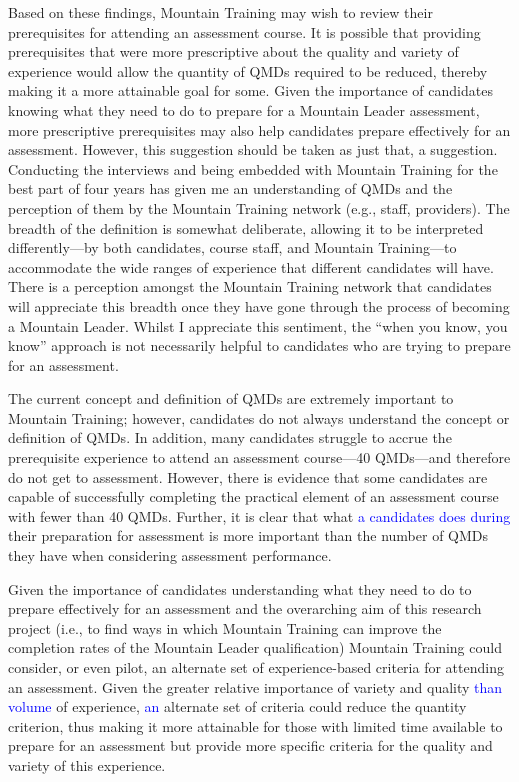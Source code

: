 \documentclass[
  12pt,
  a4paper,
]{book}
\begin{document}
Based on these findings, Mountain Training may wish to review their prerequisites for attending an assessment course. It is possible that providing prerequisites that were more prescriptive about the quality and variety of experience would allow the quantity of QMDs required to be reduced, thereby making it a more attainable goal for some. Given the importance of candidates knowing what they need to do to prepare for a Mountain Leader assessment, more prescriptive prerequisites may also help candidates prepare effectively for an assessment. However, this suggestion should be taken as just that, a suggestion. Conducting the interviews and being embedded with Mountain Training for the best part of four years has given me an understanding of QMDs and the perception of them by the Mountain Training network (e.g., staff, providers). The breadth of the definition is somewhat deliberate, allowing it to be interpreted differently---by both candidates, course staff, and Mountain Training---to accommodate the wide ranges of experience that different candidates will have. There is a perception amongst the Mountain Training network that candidates will appreciate this breadth once they have gone through the process of becoming a Mountain Leader. Whilst I appreciate this sentiment, the ``when you know, you know'' approach is not necessarily helpful to candidates who are trying to prepare for an assessment.

The current concept and definition of QMDs are extremely important to Mountain Training; however, candidates do not always understand the concept or definition of QMDs. In addition, many candidates struggle to accrue the prerequisite experience to attend an assessment course---40 QMDs---and therefore do not get to assessment. However, there is evidence that some candidates are capable of successfully completing the practical element of an assessment course with fewer than 40 QMDs. Further, it is clear that what \textcolor{blue}{a candidates does during} their preparation for assessment is more important than the number of QMDs they have when considering assessment performance.

Given the importance of candidates understanding what they need to do to prepare effectively for an assessment and the overarching aim of this research project (i.e., to find ways in which Mountain Training can improve the completion rates of the Mountain Leader qualification) Mountain Training could consider, or even pilot, an alternate set of experience-based criteria for attending an assessment. Given the greater relative importance of variety and quality \textcolor{blue}{than volume} of experience, \textcolor{blue}{an} alternate set of criteria could reduce the quantity criterion, thus making it more attainable for those with limited time available to prepare for an assessment but provide more specific criteria for the quality and variety of this experience.
\end{document}
